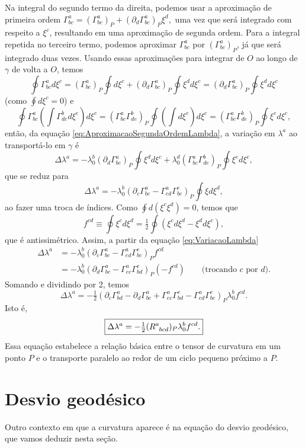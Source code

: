 Na integral do segundo termo da direita, podemos usar a aproximação de primeira ordem $\Gamma^a_{bc}=(\Gamma^a_{bc})_P+(\partial_d\Gamma^a_{bc})_P\xi^d,$ uma vez que será integrado com respeito a $\xi^c$, resultando em uma aproximação de segunda ordem. Para a integral repetida no terceiro termo, podemos aproximar $\Gamma^a_{bc}$ por $(\Gamma^a_{bc})_P$, já que será integrado duas vezes. Usando essas aproximações para integrar de $O$ ao longo de $\gamma$ de volta a $O$, temos
\[
	\oint\Gamma^a_{bc}d\xi^c=(\Gamma^a_{bc})_P\oint d\xi^c+(\partial_d\Gamma^a_{bc})_P\oint\xi^d d\xi^c = (\partial_d \Gamma^a_{bc})_P\oint\xi^d d\xi^c
\]
(como $\oint d\xi^c=0$) e
\[
	\oint\Gamma^a_{bc}\left( \int\Gamma^b_{de} d\xi^e\right)d\xi^c = (\Gamma^a_{bc}\Gamma^b_{de})_P\oint \left( \int d\xi^e \right)d\xi^c = (\Gamma^a_{bc}\Gamma^b_{de})_P \oint\xi^e d\xi^c ,
\]
então, da equação \eqref{eq:AproximacaoSegundaOrdemLambda}, a variação em $\lambda^a$ ao transportá-lo em $\gamma$ é
\[
	\Delta\lambda^a = -\lambda^b_0(\partial_d\Gamma^a_{bc})_P\oint\xi^d d\xi^c+\lambda^d_0(\Gamma^a_{bc}\Gamma^b_{de})_P\oint\xi^e d\xi^c,
\]
que se reduz para
\begin{equation}\label{eq:VariacaoLambda}
	\Delta\lambda^a=-\lambda_0^b(\partial_c\Gamma^a_{bc}-\Gamma^a_{ed}\Gamma^e_{bc})_P\oint\xi d\xi^d ,
\end{equation}
ao fazer uma troca de índices. Como $\oint d(\xi^c\xi^d)=0$, temos que
\[
	f^{cd}\equiv\oint \xi^c d\xi^d = \tfrac{1}{2}\oint(\xi^c d\xi^d-\xi^d d\xi^c),
\]
que é antissimétrico. Assim, a partir da equação \eqref{eq:VariacaoLambda}
\begin{align*}
\Delta\lambda^a &=-\lambda_0^b(\partial_c\Gamma^a_{bc}-\Gamma^a_{ed}\Gamma^e_{bc})_P f^{cd} \\
&=-\lambda_0^b(\partial_d\Gamma^a_{bc}-\Gamma^a_{ec}\Gamma^e_{bd})_P(-f^{cd}) \qquad \text{(trocando $c$ por $d$)}.
\end{align*}
Somando e dividindo por 2, temos
\[
\Delta\lambda^a = -\tfrac{1}{2}(
	\partial_c\Gamma^a_{bd}-\partial_d\Gamma^a_{bc}+\Gamma^a_{ec}\Gamma^e_{bd}-\Gamma^a_{ed}\Gamma^e_{bc}
	)_P\lambda^b_0 f^{cd} .
\]
Isto é, 
\begin{equation}\label{eq:VariacaoLambdaRiemann}
	\boxed{
		\Delta\lambda^a=-\tfrac{1}{2}(\tensor{R}{^a_{bcd}})_P\lambda^b_0 f^{cd}.
	}
\end{equation}
Essa equação estabelece a relação básica entre o tensor de curvatura em um ponto $P$ e o transporte paralelo ao redor de um ciclo pequeno próximo a $P$.

\section{Desvio geodésico}\label{sec:DesvioGeodesico}
Outro contexto em que a curvatura aparece é na equação do desvio geodésico, que vamos deduzir nesta seção.

